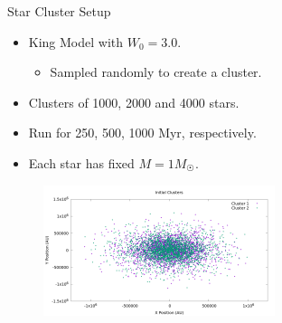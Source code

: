 \documentclass{beamer}
\begin{document}
\begin{frame}{Star Cluster Setup}
    \begin{itemize}
        \item King Model with $W_0 = 3.0$.
            \begin{itemize}
                \item Sampled randomly to create a cluster.
            \end{itemize}
        \item Clusters of 1000, 2000 and 4000 stars.
        \item Run for 250, 500, 1000 Myr, respectively.
        \item Each star has fixed $M = 1 M_{\astrosun}$.
    \end{itemize}
    \begin{figure}
        \centering
        \includegraphics[height=1.5in]{cluster_superimposed.png}
    \end{figure}
\end{frame}
\end{document}
